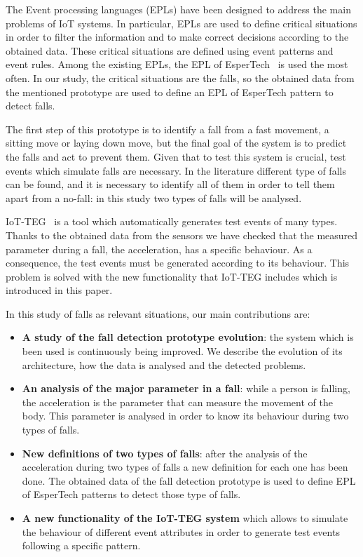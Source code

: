 \documentclass[review]{elsarticle}
\begin{document}
The Event processing languages (EPLs) have been designed to address the main problems of 
IoT systems. In particular, EPLs are used to define critical situations in order to filter the 
information and to make correct decisions according to the obtained data. These critical 
situations are defined using event patterns and event rules. Among the existing EPLs, the 
EPL of EsperTech~\cite{Esper:2016} is used the most often. In our study, the critical situations are the falls,
so the obtained data from the mentioned prototype are used to define an EPL of EsperTech 
pattern to detect falls.

The first step of this prototype is to identify a fall from a fast movement, a sitting move or laying 
down move, but the final goal of the system is to predict the falls and act to prevent 
them. Given that to test this system is crucial, test events which simulate falls are necessary. In 
the literature different type of falls can be found, and it is necessary to identify all of them in 
order to tell them apart from a no-fall: in this study two types of falls will be analysed. 

IoT-TEG~\cite{TesisGutierrez2017,Gutierrez2017} is a tool which automatically generates test events 
of many types. Thanks to the obtained data from the sensors we have checked that the measured 
parameter during a fall, the acceleration, has a specific behaviour. As a consequence, the test events 
must be generated according to its behaviour. This problem is solved with the new functionality that 
IoT-TEG includes which is introduced in this paper. %

In this study of falls as relevant situations, our main contributions are:

\begin{itemize}
\item \textbf{A study of the fall detection prototype evolution}: the system which is been used is
 continuously being improved. We describe the evolution of its architecture, how the data is analysed and 
 the detected problems.
 \item \textbf{An analysis of the major parameter in a fall}: while a person is falling, the acceleration 
 is the parameter that can measure the movement of the body. This parameter is analysed in order to know 
 its behaviour during two types of falls.
 \item \textbf{New definitions of two types of falls}: after the analysis of the acceleration during two 
 types of falls a new definition for each one has been done. The obtained data of the fall detection 
 prototype is used to define EPL of EsperTech patterns to detect those type of falls. 
 \item \textbf{A new functionality of the IoT-TEG system} which allows to simulate the behaviour of 
 different event attributes in order to generate test events following a specific pattern. 
\end{itemize}
\end{document}
